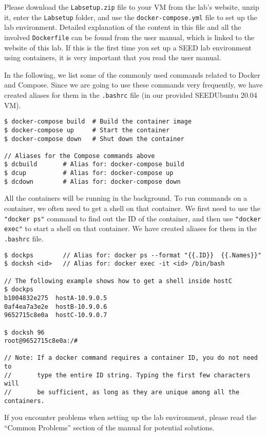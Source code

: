 Please download the
\texttt{Labsetup.zip} file to your VM from the lab's website,
unzip it, enter the \texttt{Labsetup} folder, and 
use the \texttt{docker-compose.yml} file to 
set up the lab environment. Detailed explanation
of the content in this file and all the involved 
\texttt{Dockerfile} can be found from the 
user manual, which is linked to the website of this lab.
If this is the first time you set up a SEED lab environment
using containers, it is very important that you read 
the user manual. 

In the following, we list some of the commonly
used commands related to Docker and Compose. 
Since we are going to use 
these commands very frequently, we have created aliases for them
in the \texttt{.bashrc} file (in our provided SEEDUbuntu 20.04 VM).


\begin{lstlisting}
$ docker-compose build  # Build the container image
$ docker-compose up     # Start the container
$ docker-compose down   # Shut down the container

// Aliases for the Compose commands above
$ dcbuild       # Alias for: docker-compose build
$ dcup          # Alias for: docker-compose up
$ dcdown        # Alias for: docker-compose down
\end{lstlisting}


All the containers will be running in the background. To run
commands on a container, we often need to get a shell on
that container. We first need to use the \texttt{"docker ps"}  
command to find out the ID of the container, and then
use \texttt{"docker exec"} to start a shell on that 
container. We have created aliases for them in
the \texttt{.bashrc} file.

\begin{lstlisting}
$ dockps        // Alias for: docker ps --format "{{.ID}}  {{.Names}}" 
$ docksh <id>   // Alias for: docker exec -it <id> /bin/bash

// The following example shows how to get a shell inside hostC
$ dockps
b1004832e275  hostA-10.9.0.5
0af4ea7a3e2e  hostB-10.9.0.6
9652715c8e0a  hostC-10.9.0.7

$ docksh 96
root@9652715c8e0a:/#  

// Note: If a docker command requires a container ID, you do not need to 
//       type the entire ID string. Typing the first few characters will 
//       be sufficient, as long as they are unique among all the containers. 
\end{lstlisting}


If you encounter problems when setting up the lab environment, 
please read the ``Common Problems'' section of the manual
for potential solutions.

